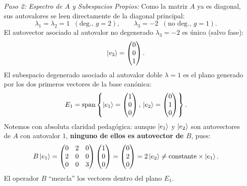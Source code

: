 \begin{ejemplobox}
    \textit{Paso 2: Espectro de $A$ y Subespacios Propios:}
    Como la matriz $A$ ya es diagonal, sus autovalores se leen directamente de la diagonal principal:
    \begin{equation}
        \lambda_1 = \lambda_2 = 1 \;\; (\text{deg., } g=2), \qquad \lambda_3 = -2 \;\; (\text{no deg., } g=1).
    \end{equation}
    El autovector asociado al autovalor no degenerado $\lambda_3 = -2$ es único (salvo fase):
    \begin{equation}
        \left| v_3 \right\rangle = \begin{pmatrix} 0 \\ 0 \\ 1 \end{pmatrix}.
    \end{equation}
    El subespacio degenerado asociado al autovalor doble $\lambda = 1$ es el plano generado por los dos primeros vectores de la base canónica:
    \begin{equation}
        E_1 = \mathrm{span}\left\{ \left| e_1 \right\rangle = \begin{pmatrix} 1 \\ 0 \\ 0 \end{pmatrix}, \, \left| e_2 \right\rangle = \begin{pmatrix} 0 \\ 1 \\ 0 \end{pmatrix} \right\}.
    \end{equation}
    Notemos con absoluta claridad pedagógica: aunque $\left| e_1 \right\rangle$ y $\left| e_2 \right\rangle$ son autovectores de $A$ con autovalor $1$, \textbf{ninguno de ellos es autovector de $B$}, pues:
    \begin{equation}
        B\left| e_1 \right\rangle = \begin{pmatrix} 0 & 2 & 0 \\ 2 & 0 & 0 \\ 0 & 0 & 3 \end{pmatrix}\begin{pmatrix} 1 \\ 0 \\ 0 \end{pmatrix} = \begin{pmatrix} 0 \\ 2 \\ 0 \end{pmatrix} = 2\left| e_2 \right\rangle \neq \text{constante} \times \left| e_1 \right\rangle.
    \end{equation}
    El operador $B$ \enquote{mezcla} los vectores dentro del plano $E_1$.


\end{ejemplobox}
